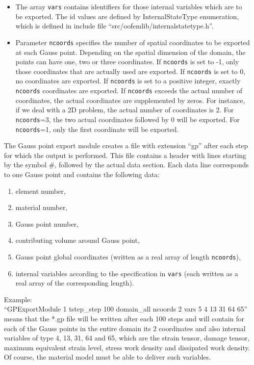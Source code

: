 \documentclass[a4paper]{article}
\newcommand{\param}[1]{\texttt{#1}} %
\begin{document}
\begin{itemize}
\begin{itemize}
\item The array \param{vars} contains identifiers for those internal
variables which are to be exported. The id values are defined by
InternalStateType enumeration, which is defined in include file
``src/oofemlib/internal\-statetype.h''.
\item Parameter \param{ncoords} specifies the number of spatial coordinates to be exported at each Gauss point. Depending on the spatial dimension of the
domain, the points can have one, two or three coordinates. If  \param{ncoords}
is set to -1, only those coordinates that are actually used are exported.
 If  \param{ncoords} is set to 0, no coordinates are exported.
If  \param{ncoords}
is set to a positive integer, exactly \param{ncoords} coordinates are exported.
If  \param{ncoords} exceeds the actual number of coordinates, the actual
coordinates are supplemented by zeros. For instance, if we deal with a 2D
problem, the actual number of coordinates is 2. For  \param{ncoords}=3,
the two actual coordinates followed by 0 will be exported.
For  \param{ncoords}=1, only the first coordinate will be exported.
\end{itemize}
The Gauss point export module creates a file with extension ``gp''
after each step for which the output is performed. This file contains
a header with lines starting by the symbol \#, followed by the actual data
section.
Each data line corresponds to one Gauss point and contains the following
data:
\begin{enumerate}
\item element number,
 \item    material number,
 \item     Gauss point number,
  \item   contributing volume around Gauss point,
\item Gauss point global coordinates (written as a real array of length \param{ncoords}),
\item internal variables according to the specification in \param{vars} (each written as a real array of the corresponding length).
\end{enumerate}
Example:\\
``GPExportModule 1 tstep\_step 100 domain\_all ncoords 2 vars 5 4 13 31 64 65''
\\
means that the *.gp file will be written after each 100 steps and will contain
for each of the Gauss points in the entire domain its 2 coordinates and also internal
variables of type 4, 13, 31, 64 and 65, which are the strain tensor, damage tensor, maximum equivalent strain level, stress work density and dissipated work density. Of course, the material model must be able to deliver such variables. 

\end{itemize}
\end{document}
